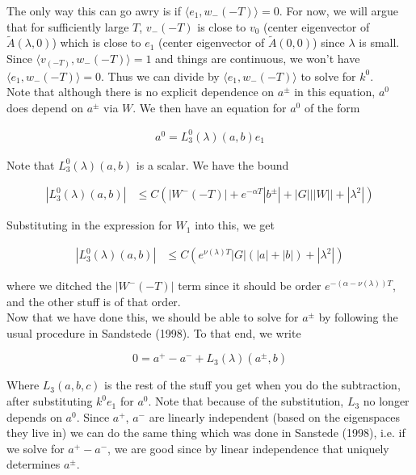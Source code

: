 \documentclass[12pt]{article}
\begin{document}
\begin{enumerate}
The only way this can go awry is if $\langle e_1, w_-(-T) \rangle = 0$. For now, we will argue that for sufficiently large $T$, $v_-(-T)$ is close to $v_0$ (center eigenvector of $\tilde{A}(\lambda, 0)$) which is close to $e_1$ (center eigenvector of $\tilde{A}(0, 0)$) since $\lambda$ is small. Since $\langle v_(-T), w_-(-T) \rangle = 1$ and things are continuous, we won't have $\langle e_1, w_-(-T) \rangle = 0$. Thus we can divide by $\langle e_1, w_-(-T) \rangle$ to solve for $k^0$.
\\

Note that although there is no explicit dependence on $a^\pm$ in this equation, $a^0$ does depend on $a^\pm$ via $W$. We then have an equation for $a^0$ of the form

\begin{align*}
a^0 = L^0_3(\lambda)(a, b) e_1
\end{align*}

Note that $L^0_3(\lambda)(a, b)$ is a scalar. We have the bound

\begin{align*}
|L^0_3(\lambda)(a, b)| &\leq C( |W^-(-T)| + e^{-\alpha T}|b^\pm| + |G|||W|| + |\lambda^2| )
\end{align*}

Substituting in the expression for $W_1$ into this, we get

\begin{align*}
|L^0_3(\lambda)(a, b)| &\leq C( e^{\nu(\lambda)T}|G|(|a| + |b|) + |\lambda^2| )
\end{align*}

where we ditched the $|W^-(-T)|$ term since it should be order $e^{-(\alpha - \nu(\lambda))T}$, and the other stuff is of that order. \\

Now that we have done this, we should be able to solve for $a^\pm$ by following the usual procedure in Sandstede (1998). To that end, we write

\[
0 = a^+ - a^- + L_3(\lambda)(a^\pm,b)
\] 

Where $L_3(a,b,c)$ is the rest of the stuff you get when you do the subtraction, after substituting $k^0 e_1$ for $a^0$. Note that because of the substitution, $L_3$ no longer depends on $a^0$. Since $a^+$, $a^-$ are linearly independent (based on the eigenspaces they live in) we can do the same thing which was done in Sanstede (1998), i.e. if we solve for $a^+ - a^-$, we are good since by linear independence that uniquely determines $a^\pm$.\\ 


\end{enumerate}
\end{document}
